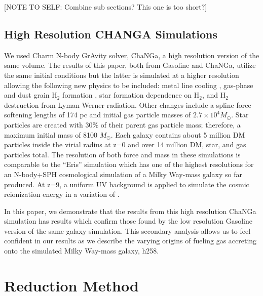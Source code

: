 \documentclass[manuscript]{aastex}
\begin{document}
[NOTE TO SELF: Combine sub sections? This one is too short?]
	

\subsection{High Resolution CHANGA Simulations}

We used Charm N-body GrAvity solver, ChaNGa, a high resolution version of the same volume. The results of this paper, both from Gasoline and ChaNGa, utilize the same initial conditions but the latter is simulated at a higher resolution allowing the following new physics to be included: metal line cooling \citep{Christensen2012,Shen2010}, gas-phase and dust grain H$_2$ formation \citep{Christensen2014}, star formation dependence on H$_2$, and H$_2$ destruction from Lyman-Werner radiation. Other changes include a spline force softening lengths of 174 pc and initial gas particle masses of $2.7 \times 10^4 M_{\odot}$. Star particles are created with 30\% of their parent gas particle mass; therefore, a maximum initial mass of 8100 $M_{\odot}$. Each galaxy contains about 5 million DM particles inside the virial radius at z=0 and over 14 million DM, star, and gas particles total. The resolution of both force and mass in these simulations is comparable to the ``Eris'' simulation which has one of the highest resolutions for an N-body+SPH cosmological simulation of a Milky Way-mass galaxy so far produced.  At z=9, a uniform UV background is applied to simulate the cosmic reionization energy in a variation of \cite{Haardt2012}.

In this paper, we demonstrate that the results from this high resolution ChaNGa simulation has results which confirm those found by the low resolution Gasoline version of the same galaxy simulation. This secondary analysis allows us to feel confident in our results as we describe the varying origins of fueling gas accreting onto the simulated Milky Way-mass galaxy, h258.
	

\section{Reduction Method}\label{redux}
\end{document}
